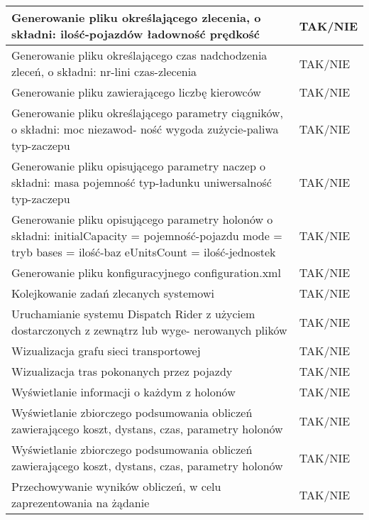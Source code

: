 \begin{tabularx}{\textwidth}{ |X|p{2cm}| }
  \hline
  Generowanie pliku określającego zlecenia, o składni: ilość-pojazdów ładowność
prędkość
 & TAK/NIE  \\
  \hline
  Generowanie pliku określającego czas nadchodzenia zleceń, o składni: nr-lini czas-zlecenia  & TAK/NIE  \\
  \hline
  Generowanie pliku zawierającego liczbę kierowców & TAK/NIE \\
  \hline
  Generowanie pliku określającego parametry ciągników, o składni: moc niezawod-
ność wygoda zużycie-paliwa typ-zaczepu & TAK/NIE \\
  \hline
  Generowanie pliku opisującego parametry naczep o składni: masa pojemność
typ-ładunku uniwersalność typ-zaczepu & TAK/NIE \\
  \hline
  Generowanie pliku opisującego parametry holonów o składni: initialCapacity =
pojemność-pojazdu mode = tryb bases = ilość-baz eUnitsCount = ilość-jednostek & TAK/NIE \\
  \hline
  Generowanie pliku konfiguracyjnego configuration.xml & TAK/NIE \\
  \hline
  Kolejkowanie zadań zlecanych systemowi & TAK/NIE \\
  \hline
  Uruchamianie systemu Dispatch Rider z użyciem dostarczonych z zewnątrz lub wyge-
nerowanych plików & TAK/NIE \\
  \hline
  Wizualizacja grafu sieci transportowej & TAK/NIE \\
  \hline
  Wizualizacja tras pokonanych przez pojazdy & TAK/NIE \\
  \hline
  Wyświetlanie informacji o każdym z holonów & TAK/NIE \\
  \hline
  Wyświetlanie zbiorczego podsumowania obliczeń zawierającego koszt, dystans, czas, parametry holonów & TAK/NIE \\
  \hline
  Wyświetlanie zbiorczego podsumowania obliczeń zawierającego koszt, dystans, czas,
parametry holonów & TAK/NIE \\
  \hline 
  Przechowywanie wyników obliczeń, w celu zaprezentowania na żądanie & TAK/NIE \\
  \hline
\end{tabularx}